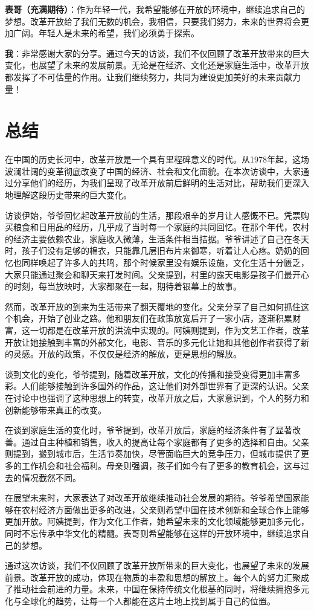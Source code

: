 \documentclass[12pt,a4paper]{article}%
\begin{document}
\textbf{表哥（充满期待）}：作为年轻一代，我希望能够在开放的环境中，继续追求自己的梦想。改革开放给了我们无数的机会，我相信，只要我们努力，未来的世界将会更加广阔。年轻人是未来的希望，我们必须勇于探索。

\textbf{我}：非常感谢大家的分享。通过今天的访谈，我们不仅回顾了改革开放带来的巨大变化，也展望了未来的发展前景。无论是在经济、文化还是家庭生活中，改革开放都发挥了不可估量的作用。让我们继续努力，共同为建设更加美好的未来贡献力量！

	\section*{总结}

  在中国的历史长河中，改革开放是一个具有里程碑意义的时代。从1978年起，这场波澜壮阔的变革彻底改变了中国的经济、社会和文化面貌。在本次访谈中，大家通过分享他们的经历，为我们呈现了改革开放前后鲜明的生活对比，帮助我们更深入地理解这段历史带来的巨大变化。

  访谈伊始，爷爷回忆起改革开放前的生活，那段艰辛的岁月让人感慨不已。凭票购买粮食和日用品的经历，几乎成了当时每一个家庭的共同回忆。在那个年代，农村的经济主要依赖农业，家庭收入微薄，生活条件相当拮据。爷爷讲述了自己在冬天时，孩子们没有足够的棉衣，只能靠几层旧布片来御寒，听着让人心疼。奶奶的回忆也同样唤起了许多人的共鸣，那个时候家里没有娱乐设施，文化生活十分匮乏，大家只能通过聚会和聊天来打发时间。父亲提到，村里的露天电影是孩子们最开心的时刻，每当放映时，大家都聚在一起，期待着银幕上的故事。
  
  然而，改革开放的到来为生活带来了翻天覆地的变化。父亲分享了自己如何抓住这个机会，开始了创业之路。他和朋友们在政策放宽后开了一家小店，逐渐积累财富，这一切都是在改革开放的洪流中实现的。阿姨则提到，作为文艺工作者，改革开放让她接触到丰富的外部文化，电影、音乐的多元化让她和其他创作者获得了新的灵感。开放的政策，不仅仅是经济的解放，更是思想的解放。
  
  谈到文化的变化，爷爷提到，随着改革开放，文化的传播和接受变得更加丰富多彩。人们能够接触到许多国外的作品，这让他们对外部世界有了更深的认识。父亲在讨论中也强调了这种思想上的转变，改革开放之后，大家意识到，个人的努力和创新能够带来真正的改变。
  
  在谈到家庭生活的变化时，爷爷提到，改革开放后，家庭的经济条件有了显著改善。通过自主种植和销售，收入的提高让每个家庭都有了更多的选择和自由。父亲则提到，搬到城市后，生活节奏加快，尽管面临巨大的竞争压力，但城市提供了更多的工作机会和社会福利。母亲则强调，孩子们如今有了更多的教育机会，这与过去的情况截然不同。
  
  在展望未来时，大家表达了对改革开放继续推动社会发展的期待。爷爷希望国家能够在农村经济方面做出更多的改进，父亲则希望中国在技术创新和全球合作上能够更加开放。阿姨提到，作为文化工作者，她希望未来的文化领域能够更加多元化，同时不忘传承中华文化的精髓。表哥则希望能够在这样的开放环境中，继续追求自己的梦想。
  
  通过这次访谈，我们不仅回顾了改革开放所带来的巨大变化，也展望了未来的发展前景。改革开放的成功，体现在物质的丰盈和思想的解放上。每个人的努力汇聚成了推动社会前进的力量。未来，中国在保持传统文化根基的同时，将继续拥抱多元化与全球化的趋势，让每一个人都能在这片土地上找到属于自己的位置。
  

  
\end{document}
